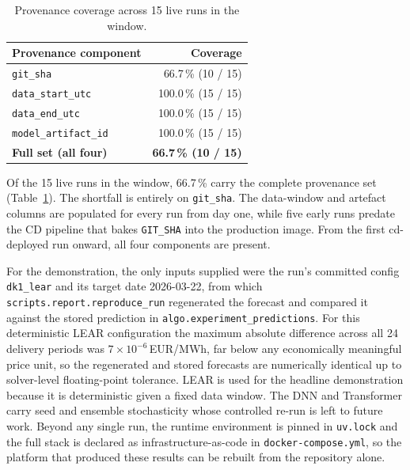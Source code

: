 \begin{table}[h]
  \centering
  \caption{Provenance coverage across 15 live runs in the window.}
  \label{tab:res-repro-coverage}
  \renewcommand{\arraystretch}{1.3}
  \begin{tabularx}{\linewidth}{@{}>{\raggedright\arraybackslash}X r@{}}
    \toprule
    \textbf{Provenance component} & \textbf{Coverage} \\
    \midrule
    \texttt{git\_sha}                          & 66.7\,\% (10 / 15) \\
    \texttt{data\_start\_utc}                  & 100.0\,\% (15 / 15) \\
    \texttt{data\_end\_utc}                    & 100.0\,\% (15 / 15) \\
    \texttt{model\_artifact\_id}               & 100.0\,\% (15 / 15) \\
    \midrule
    \textbf{Full set (all four)}                & \textbf{66.7\,\% (10 / 15)} \\
    \bottomrule
  \end{tabularx}
\end{table}

Of the 15 live runs in the window, 66.7\,\% carry the complete provenance set
(Table~\ref{tab:res-repro-coverage}). The shortfall is entirely on
\texttt{git\_sha}. The data-window and artefact columns are populated for every
run from day one, while five early runs predate the CD pipeline that bakes
\texttt{GIT\_SHA} into the production image. From the first cd-deployed run
onward, all four components are present.

For the demonstration, the only inputs supplied were the run's committed config
\texttt{dk1\_lear} and its target date 2026-03-22, from which
\texttt{scripts.report.reproduce\_run} regenerated the forecast and compared it
against the stored prediction in \texttt{algo.experiment\_\allowbreak predictions}. For this
deterministic LEAR configuration the maximum absolute difference across all 24
delivery periods was $7\times10^{-6}$\,EUR/MWh, far below any economically
meaningful price unit, so the regenerated and stored forecasts are numerically
identical up to solver-level floating-point tolerance. LEAR is used for the
headline demonstration because it is deterministic given a fixed data window. The
DNN and Transformer carry seed and ensemble stochasticity whose controlled re-run
is left to future work. Beyond any single run, the runtime environment is pinned
in \texttt{uv.lock} and the full stack is declared as infrastructure-as-code in
\texttt{docker-compose.yml}, so the platform that produced these results can be
rebuilt from the repository alone.


